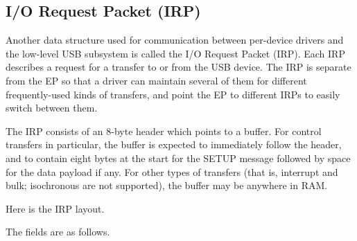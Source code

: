 \subsection{I/O Request Packet (IRP)}

Another data structure used for communication between per-device drivers and
the low-level USB subsystem is called the I/O Request Packet (IRP).  Each
IRP describes a request for a transfer to or from the USB device.  The IRP
is separate from the EP so that a driver can maintain several of them for
different frequently-used kinds of transfers, and point the EP to different
IRPs to easily switch between them.

The IRP consists of an 8-byte header which points to a buffer.  For control
transfers in particular, the buffer is expected to immediately follow the
header, and to contain eight bytes at the start for the SETUP message
followed by space for the data payload if any.  For other types of transfers
(that is, interrupt and bulk; isochronous are not supported), the buffer may
be anywhere in RAM.

\pagebreak
Here is the IRP layout.


The fields are as follows.

